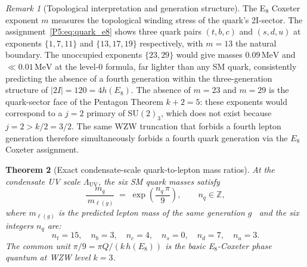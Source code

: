 \documentclass[11pt,a4paper]{article}
\newtheorem{theorem}{Theorem}[section]
\theoremstyle{definition}
\theoremstyle{remark}
\newtheorem{remark}[theorem]{Remark}
\newcommand{\LUV}{\Lambda_{\mathrm{UV}}}
\begin{document}
\begin{remark}[Topological interpretation and generation structure]
\label{P5:rem:other_quarks}
The E$_8$ Coxeter exponent $m$ measures the topological winding stress
of the quark's 2I-sector.  The assignment~\eqref{P5:eq:quark_e8} shows
three quark pairs $(t,b,c)$ and $(s,d,u)$ at exponents $\{1,7,11\}$ and $\{13,17,19\}$
respectively, with $m=13$ the natural boundary.
The unoccupied exponents $\{23,29\}$ would give masses $0.09\,\mathrm{MeV}$
and $\ll 0.01\,\mathrm{MeV}$ at the level-0 formula, far lighter than any
SM quark, consistently predicting the absence of a fourth generation
within the three-generation structure of $|2I| = 120 = 4h(E_8)$.
The absence of $m=23$ and $m=29$ is the quark-sector face of the Pentagon
Theorem $k+2=5$: these exponents would correspond to a $j=2$ primary of
$\mathrm{SU}(2)_3$, which does not exist because $j=2 > k/2 = 3/2$.
The same WZW truncation that forbids a fourth lepton generation
therefore simultaneously forbids a fourth quark generation via the $E_8$
Coxeter assignment.
\end{remark}

\begin{theorem}[Exact condensate-scale quark-to-lepton mass ratios]
\label{P5:thm:quark_lepton_ratios}
At the condensate UV scale $\LUV$, the six SM quark masses satisfy
\begin{equation}
  \frac{m_q}{\,m_{\ell(g)}} \;=\; \exp\!\left(\frac{n_q\,\pi}{9}\right),
  \qquad n_q \in \mathbb{Z},
  \label{P5:eq:quark_lepton_exact}
\end{equation}
where $m_{\ell(g)}$ is the predicted lepton mass of the same generation $g$~\cite{Paper1}
and the six integers $n_q$ are:
\begin{equation}
  n_t = 15,\quad n_b = 3,\quad n_c = 4,\quad n_s = 0,\quad n_d = 7,\quad n_u = 3.
  \label{P5:eq:nq_values}
\end{equation}
The common unit $\pi/9 = \pi Q/(k\,h(E_8))$ is the basic E$_8$-Coxeter phase quantum
at WZW level $k=3$.
\end{theorem}
\end{document}

